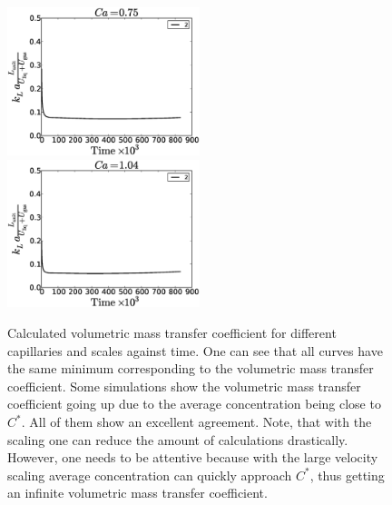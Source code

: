 \documentclass{article}
\newcommand{\cstar}{C^{*}}
\begin{document}
\begin{figure}[htb!]
\includegraphics[width=0.5\textwidth]{Figures/aver_conc_scale_ca_time05.eps}\\
\includegraphics[width=0.5\textwidth]{Figures/aver_conc_scale_ca_time14.eps}
\caption{Calculated volumetric mass transfer coefficient for different capillaries and scales
against time. One can see
that all curves have the same minimum corresponding to the volumetric mass transfer coefficient.
Some simulations show the volumetric mass transfer coefficient going up due to the average
concentration being close to $\cstar$. All of them show an excellent agreement. Note, that with the
scaling one can reduce the amount of calculations drastically. However, one needs to be attentive
because with the large velocity scaling average concentration can quickly approach $\cstar$, thus
getting an infinite volumetric mass transfer coefficient.
\label{fig:aver:conc:different:capillaries:time}}
\end{figure}
\end{document}

